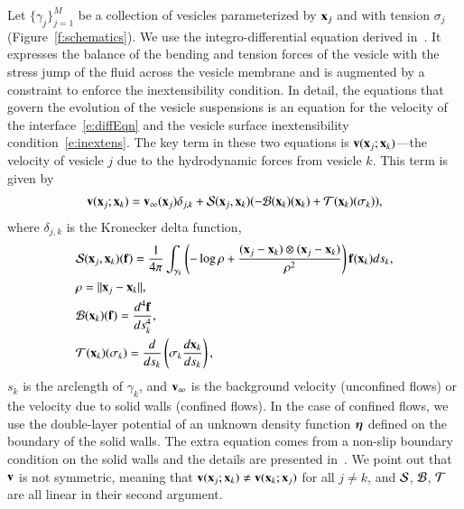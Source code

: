 Let $\{\gamma_{j}\}_{j=1}^{M}$ be a collection of vesicles
parameterized by ${\mathbf{x}}_{j}$ and with tension $\sigma_{j}$
(Figure~\ref{f:schematics}).  We use the integro-differential equation
derived in~\cite{vee:gue:zor:bir2009}.  It expresses the balance of the
bending and tension forces of the vesicle with the stress jump of the
fluid across the vesicle membrane and is augmented by a constraint to
enforce the inextensibility condition. In detail, the equations that
govern the evolution of the vesicle suspensions is an equation for the
velocity of the interface~\eqref{e:diffEqn} and the vesicle surface
inextensibility condition~\eqref{e:inextens}. The key term in these two
equations is ${\mathbf{v}}({\mathbf{x}}_{j};{\mathbf{x}}_{k})$---the velocity of vesicle $j$ due
to the hydrodynamic forces from vesicle $k$. This term is given by
\begin{align}
  {\mathbf{v}}({\mathbf{x}}_{j};{\mathbf{x}}_{k}) = {\mathbf{v}}_{\infty}({\mathbf{x}}_{j})\delta_{j,k} + {\mathcal{S}}({\mathbf{x}}_{j},{\mathbf{x}}_{k})
    (-{\mathcal{B}}({\mathbf{x}}_{k})({\mathbf{x}}_{k}) + {\mathcal{T}}({\mathbf{x}}_{k})(\sigma_{k})),
  \label{e:vesDynamics}
\end{align}
where $\delta_{j,k}$ is the Kronecker delta function,
\begin{align*}
  &{\mathcal{S}}({\mathbf{x}}_{j},{\mathbf{x}}_{k})({\mathbf{f}}) = \frac{1}{4\pi}\int_{\gamma_{k}} \left(
    -\log \rho + \frac{({\mathbf{x}}_{j} - {\mathbf{x}}_{k}) \otimes ({\mathbf{x}}_{j} - {\mathbf{x}}_{k})}{\rho^{2}} \right)
    {\mathbf{f}}({\mathbf{x}}_{k}) ds_{k}, \\
  &\rho = \|{\mathbf{x}}_{j} - {\mathbf{x}}_{k}\|, \\
  &{\mathcal{B}}({\mathbf{x}}_{k})({\mathbf{f}}) = \frac{d^{4}{\mathbf{f}}}{ds_{k}^{4}}, \\ 
  &{\mathcal{T}}({\mathbf{x}}_{k})(\sigma_{k}) =
    \frac{d}{ds_{k}}\left(\sigma_{k}\frac{d{\mathbf{x}}_{k}}{ds_{k}}\right),
\end{align*}
$s_{k}$ is the arclength of $\gamma_{k}$, and ${\mathbf{v}}_{\infty}$ is the
background velocity (unconfined flows) or the velocity due to solid
walls (confined flows).  In the case of confined flows, we use the
double-layer potential of an unknown density function ${\boldsymbol\eta}$ defined on
the boundary of the solid walls.  The extra equation comes from a
non-slip boundary condition on the solid walls and the details are
presented in~\cite{rah:vee:bir2010}.  We point out that ${\mathbf{v}}$ is not
symmetric, meaning that ${\mathbf{v}}({\mathbf{x}}_{j};{\mathbf{x}}_{k}) \neq {\mathbf{v}}({\mathbf{x}}_{k};{\mathbf{x}}_{j})$
for all $j \neq k$, and ${\mathcal{S}}$, ${\mathcal{B}}$, ${\mathcal{T}}$ are all linear in their
second argument.

